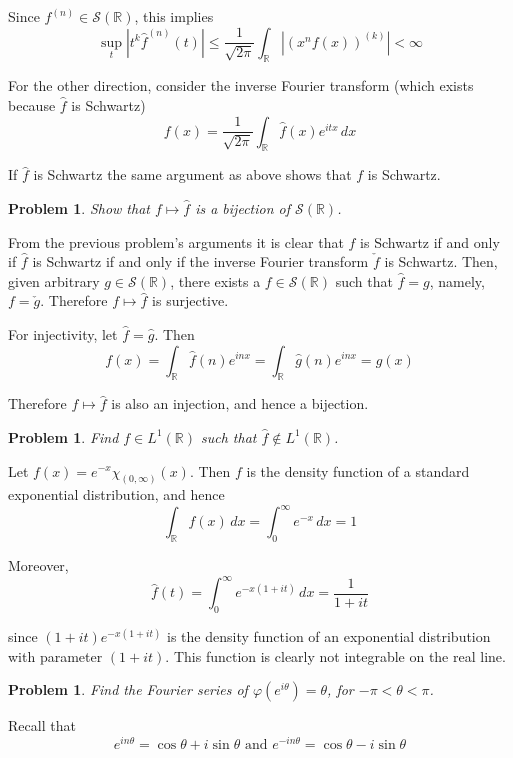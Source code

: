 \documentclass[letterpaper,11pt]{article}
\newtheorem{problem}[theorem]{Problem}
\newcommand{\R}{\mathbb{R}}
\begin{document}
Since $f^{(n)} \in \mathcal{S}(\R)$, this implies
\[
\sup_t|t^k \widehat{f}^{(n)}(t)| \leq \frac{1}{\sqrt{2\pi}} \int_\R \left|(x^n f(x))^{(k)}\right| < \infty
\]

For the other direction, consider the inverse Fourier transform (which exists because $\widehat{f}$ is Schwartz)
\[
f(x) = \frac{1}{\sqrt{2\pi}} \int_\R \widehat{f}(x) e^{itx} \,dx
\]

If $\widehat{f}$ is Schwartz the same argument as above shows that $f$ is Schwartz.
\begin{problem}
Show that $f \mapsto \widehat{f}$ is a bijection of $\mathcal{S}(\R)$.
\end{problem}

From the previous problem's arguments it is clear that $f$ is Schwartz if and only if $\widehat{f}$ is Schwartz if and only if the inverse Fourier transform $\check{f}$ is Schwartz.  Then, given arbitrary $g \in \mathcal{S}(\R)$, there exists a $f \in \mathcal{S}(\R)$ such that $\widehat{f} = g$, namely, $f = \check{g}$.  Therefore $f \mapsto \widehat{f}$ is surjective.

For injectivity, let $\widehat{f} = \widehat{g}$.  Then
\[
f(x) = \int_\R \widehat{f}(n) e^{inx} = \int_\R \widehat{g}(n) e^{inx} = g(x)
\]

Therefore $f \mapsto \widehat{f}$ is also an injection, and hence a bijection.
\begin{problem}
Find $f \in L^1(\R)$ such that $\widehat{f} \notin L^1(\R)$.
\end{problem}

Let $f(x) = e^{-x}\chi_{(0,\infty)}(x)$.  Then $f$ is the density function of a standard exponential distribution, and hence
\[
\int_\R f(x) \,dx = \int_0^\infty e^{-x} \,dx = 1
\]

Moreover, 
\[
\widehat{f}(t) = \int_0^\infty e^{-x(1+it)} \,dx = \frac{1}{1+it}
\]

since $(1+it)e^{-x(1+it)}$ is the density function of an exponential distribution with parameter $(1+it)$.  This function is clearly not integrable on the real line.

\newpage 
\begin{problem}
Find the Fourier series of $\varphi(e^{i\theta}) = \theta$, for $-\pi < \theta < \pi$.
\end{problem}

Recall that
\begin{equation}
\label{eulers_formula}
e^{in\theta} = \cos \theta + i\sin \theta \mbox{ and } e^{-in\theta} = \cos \theta - i\sin \theta
\end{equation}
\end{document}
